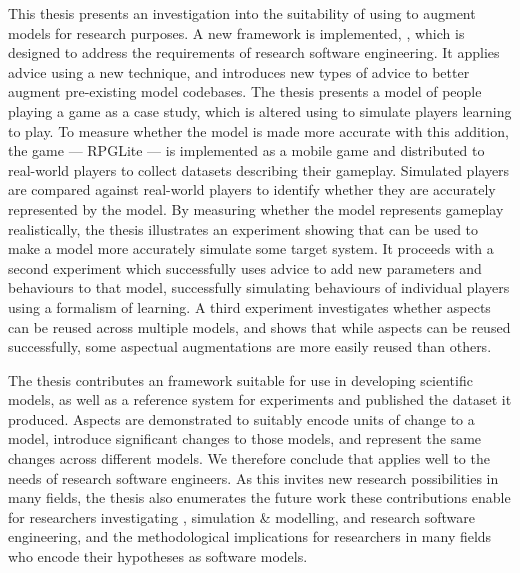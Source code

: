     This thesis presents an investigation into the suitability of using \aop{}
    to augment models for research purposes. A new \aspectorientation{}
    framework is implemented, \pdsf{}, which is designed to address the
    requirements of research software engineering. It applies advice using a new
    technique, and introduces new types of advice to better augment pre-existing
    model codebases. The thesis presents a model of people playing a game as a
    case study, which is altered using \pdsf{} to simulate players learning to
    play. To measure whether the model is made more accurate with this addition,
    the game --- RPGLite --- is implemented as a mobile game and distributed to
    real-world players to collect datasets describing their gameplay. Simulated
    players are compared against real-world players to identify whether they are
    accurately represented by the model. By measuring whether the model
    represents gameplay realistically, the thesis illustrates an experiment
    showing that \aop{} can be used to make a model more accurately simulate
    some target system. It proceeds with a second experiment which successfully
    uses advice to add new parameters and behaviours to that model, successfully
    simulating behaviours of individual players using a formalism of learning. A
    third experiment investigates whether aspects can be reused across multiple
    models, and shows that while aspects can be reused successfully, some
    aspectual augmentations are more easily reused than others. 
    
    The thesis contributes an \aspectorientation{} framework suitable for use in
    developing scientific models, as well as a reference system for experiments
    and published the dataset it produced. Aspects are demonstrated to suitably
    encode units of change to a model, introduce significant changes to those
    models, and represent the same changes across different models. We therefore
    conclude that \aop{} applies well to the needs of research software
    engineers. As this invites new research possibilities in many fields, the
    thesis also enumerates the future work these contributions enable for
    researchers investigating \aop{}, simulation \& modelling, and research
    software engineering, and the methodological implications for researchers in
    many fields who encode their hypotheses as software models. 
    
    


    




